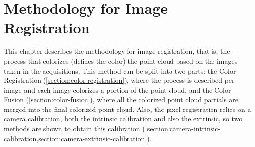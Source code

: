 \chapter{Methodology for Image Registration}
\label{section:methodology-for-image-registration}

This chapter describes the methodology for image registration, that is, the process that colorizes (defines the color) the point cloud based on the images taken in the acquisitions. This method can be split into two parts: the Color Registration (\cref{section:color-registration}), where the process is described per-image and each image colorizes a portion of the point cloud, and the Color Fusion (\cref{section:color-fusion}), where all the colorized point cloud partials are merged into the final colorized point cloud. Also, the pixel registration relies on a camera calibration, both the intrinsic calibration and also the extrinsic, so two methods are shown to obtain this calibration (\cref{section:camera-intrinsic-calibration,section:camera-extrinsic-calibration}).







